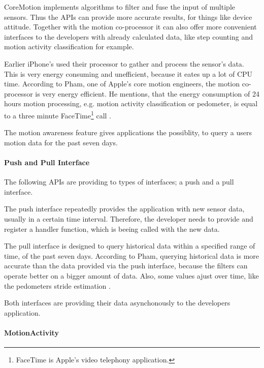 CoreMotion implements algorithms to filter and fuse the input of multiple sensors.
Thus the \acsp{API} can provide more accurate results, for things like device attitude.
Together with the motion co-processor it can also offer more convenient interfaces to the developers with already calculated data, like step counting and motion activity classification for example.

Earlier iPhone's used their processor to gather and process the sensor's data.
This is very energy consuming and unefficient, because it eates up a lot of \acs{CPU} time.
According to Pham, one of Apple's core motion engineers, the motion co-processor is very energy efficient.
He mentions, that the energy consumption of 24 hours motion processing, e.g. motion activity classification or pedometer, is equal to a three minute FaceTime\footnote{FaceTime is Apple's video telephony application.} call \cite{apple:wwdc_2014_pham}.

The motion awareness feature gives applications the possiblity, to query a users motion data for the past seven days.

\paragraph{Push and Pull Interface}
The following \acsp{API} are providing to types of interfaces; a push and a pull interface.

The push interface repeatedly provides the application with new sensor data, usually in a certain time interval.
Therefore, the developer needs to provide and register a handler function, which is beeing called with the new data.

The pull interface is designed to query historical data within a specified range of time, of the past seven days.
According to Pham, querying historical data is more accurate than the data provided via the push interface, because the filters can operate better on a bigger amount of data.
Also, some values ajust over time, like the pedometers stride estimation \cite{apple:wwdc_2014_pham}.

Both interfaces are providing their data asynchonously to the developers application.


\paragraph{MotionActivity}


